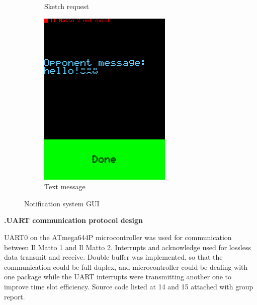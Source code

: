 \documentclass[a4paper,notitlepage,10pt]{report}
\newcommand{\tab}{\hspace{0.75cm}}
\newcommand{\fontSubHeading}{\fontsize{10pt}{11pt}\selectfont}
\newcounter{sections}
\newcounter{subsections}[sections]
\begin{document}
\begin{multicols}{2}
\begin{figure}[H]
\begin{subfigure}[b]{0.4\columnwidth}
		\caption{Sketch request}
		\label{fig:capReq}
	\end{subfigure}
	\begin{subfigure}[b]{0.4\columnwidth}
		\includegraphics[width=\textwidth]{cap_msg}
		\caption{Text message}
		\label{fig:capMsg}
	\end{subfigure}
	\caption{Notification system GUI}
	\label{fig:capNTC}
\end{figure}
\vspace{6pt}

\fontSubHeading
{}
\textbf{\thesections.\thesubsections\tab UART communication protocol design}
\vspace{6pt}

UART0 on the ATmega644P microcontroller was used for communication between Il Matto 1 and Il Matto 2. Interrupts and acknowledge used for lossless data transmit and receive. Double buffer was implemented, so that the communication could be full duplex, and microcontroller could be dealing with one package while the UART interrupts were transmitting another one to improve time slot efficiency. Source code listed at 14 and 15 attached with group report.
\vspace{6pt}


\end{multicols}
\end{document}
